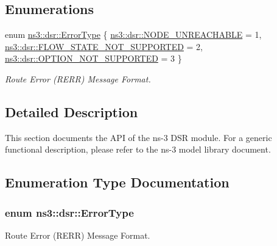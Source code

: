 \subsection*{Enumerations}
\begin{DoxyCompactItemize}
\item 
enum \hyperlink{group__dsr_ga40f62a50dc031f2853e92211aad095f4}{ns3\+::dsr\+::\+Error\+Type} \{ \hyperlink{group__dsr_gga40f62a50dc031f2853e92211aad095f4adf3df5290f2b4d470e5ea842c44b32e5}{ns3\+::dsr\+::\+N\+O\+D\+E\+\_\+\+U\+N\+R\+E\+A\+C\+H\+A\+B\+LE} = 1, 
\hyperlink{group__dsr_gga40f62a50dc031f2853e92211aad095f4a7031ed624684291a4edb70f1edba2c58}{ns3\+::dsr\+::\+F\+L\+O\+W\+\_\+\+S\+T\+A\+T\+E\+\_\+\+N\+O\+T\+\_\+\+S\+U\+P\+P\+O\+R\+T\+ED} = 2, 
\hyperlink{group__dsr_gga40f62a50dc031f2853e92211aad095f4ae18b545e5cad7897bb7182cad1111eec}{ns3\+::dsr\+::\+O\+P\+T\+I\+O\+N\+\_\+\+N\+O\+T\+\_\+\+S\+U\+P\+P\+O\+R\+T\+ED} = 3
 \}\begin{DoxyCompactList}\small\item\em Route Error (R\+E\+RR) Message Format. \end{DoxyCompactList}
\end{DoxyCompactItemize}


\subsection{Detailed Description}
This section documents the A\+PI of the ns-\/3 D\+SR module. For a generic functional description, please refer to the ns-\/3 model library document. 

\subsection{Enumeration Type Documentation}
\subsubsection[{\texorpdfstring{Error\+Type}{ErrorType}}]{\setlength{\rightskip}{0pt plus 5cm}enum {\bf ns3\+::dsr\+::\+Error\+Type}}\hypertarget{group__dsr_ga40f62a50dc031f2853e92211aad095f4}{}\label{group__dsr_ga40f62a50dc031f2853e92211aad095f4}


Route Error (R\+E\+RR) Message Format. 

